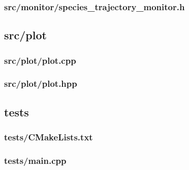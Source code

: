 \subsubsection{src/monitor/species\_trajectory\_monitor.h}


\newpage
\subsection{src/plot}
\subsubsection{src/plot/plot.cpp}

\newpage
\subsubsection{src/plot/plot.hpp}


\newpage
\subsection{tests}
\subsubsection{tests/CMakeLists.txt}

\newpage
\subsubsection{tests/main.cpp}

